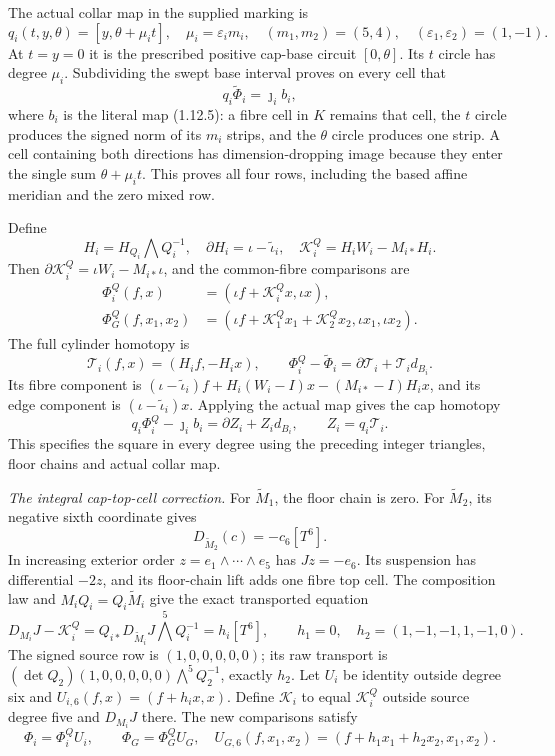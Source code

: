 The actual collar map in the supplied marking is
\[
 q_i(t,y,\theta)=[y,\theta+\mu_it],\quad
 \mu_i=\varepsilon_im_i,\quad (m_1,m_2)=(5,4),\quad
 (\varepsilon_1,\varepsilon_2)=(1,-1).
\]
At $t=y=0$ it is the prescribed positive cap-base circuit
$[0,\theta]$. Its $t$ circle has degree $\mu_i$.
Subdividing the swept base interval proves on every cell that
\[
 q_i\widetilde\Phi_i=\jmath_i b_i,
\]
where $b_i$ is the literal map (1.12.5): a fibre cell in $K$ remains
that cell, the $t$ circle produces the signed norm of its $m_i$
strips, and the $\theta$ circle produces one strip. A cell containing
both directions has dimension-dropping image because they enter the
single sum $\theta+\mu_it$. This proves all four rows, including
the based affine meridian and the zero mixed row.

Define
\[
 H_i=H_{Q_i}\bigwedge Q_i^{-1},\quad
 \partial H_i=\iota-\widetilde\iota_i,\quad
 \mathcal K_i^Q=H_iW_i-M_{i*}H_i.
\]
Then $\partial\mathcal K_i^Q=\iota W_i-M_{i*}\iota$, and the
common-fibre comparisons are
\[
\begin{split}
 \Phi_i^Q(f,x)&=(\iota f+\mathcal K_i^Qx,\iota x),\\
 \Phi_G^Q(f,x_1,x_2)&=
 (\iota f+\mathcal K_1^Qx_1+\mathcal K_2^Qx_2,
                                      \iota x_1,\iota x_2).
\end{split}
\]
The full cylinder homotopy is
\[
 \mathcal T_i(f,x)=(H_if,-H_ix),\qquad
 \Phi_i^Q-\widetilde\Phi_i
       =\partial\mathcal T_i+\mathcal T_i d_{B_i}.
\]
Its fibre component is
$(\iota-\widetilde\iota_i)f+H_i(W_i-I)x-(M_{i*}-I)H_ix$,
and its edge component is $(\iota-\widetilde\iota_i)x$.
Applying the actual map gives the cap homotopy
\[
 q_i\Phi_i^Q-\jmath_i b_i=\partial Z_i+Z_i d_{B_i},
 \qquad Z_i=q_i\mathcal T_i.
\]
This specifies the square in every degree using the preceding
integer triangles, floor chains and actual collar map.

\item \emph{The integral cap-top-cell correction.}
For $\widetilde M_1$, the floor chain is zero. For
$\widetilde M_2$, its negative sixth coordinate gives
\[
 D_{\widetilde M_2}(c)=-c_6[T^6].
\]
In increasing exterior order $z=e_1\wedge\cdots\wedge e_5$
has $Jz=-e_6$. Its suspension has differential $-2z$, and its
floor-chain lift adds one fibre top cell. The composition law and
$M_iQ_i=Q_i\widetilde M_i$ give the exact transported equation
\[
 D_{M_i}J-\mathcal K_i^Q
   =Q_{i*}D_{\widetilde M_i}J\bigwedge^5Q_i^{-1}=h_i[T^6],
 \qquad h_1=0,\quad h_2=(1,-1,-1,1,-1,0).
\]
The signed source row is $(1,0,0,0,0,0)$; its raw transport is
$(\det Q_2)(1,0,0,0,0,0)\bigwedge^5Q_2^{-1}$, exactly $h_2$.
Let $U_i$ be identity outside degree six and
$U_{i,6}(f,x)=(f+h_ix,x)$. Define $\mathcal K_i$ to equal
$\mathcal K_i^Q$ outside source degree five and $D_{M_i}J$ there.
The new comparisons satisfy
\[
 \Phi_i=\Phi_i^QU_i,\qquad \Phi_G=\Phi_G^QU_G,
 \quad U_{G,6}(f,x_1,x_2)=(f+h_1x_1+h_2x_2,x_1,x_2).
\]

